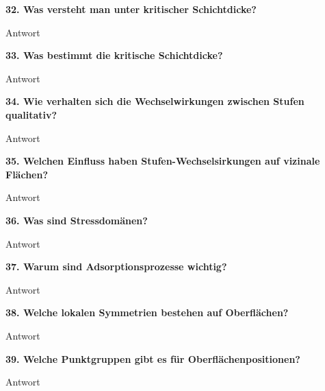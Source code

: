 \noindent\textbf{32. Was versteht man unter kritischer Schichtdicke?}\\
\begin{addmargin}[25pt]{0pt}
Antwort\\
\end{addmargin}

\noindent\textbf{33. Was bestimmt die kritische Schichtdicke?}\\
\begin{addmargin}[25pt]{0pt}
Antwort\\
\end{addmargin}

\noindent\textbf{34. Wie verhalten sich die Wechselwirkungen zwischen Stufen qualitativ?}\\
\begin{addmargin}[25pt]{0pt}
Antwort\\
\end{addmargin}

\noindent\textbf{35. Welchen Einfluss haben Stufen-Wechselsirkungen auf vizinale Flächen?}\\
\begin{addmargin}[25pt]{0pt}
Antwort\\
\end{addmargin}

\noindent\textbf{36. Was sind Stressdomänen?}\\
\begin{addmargin}[25pt]{0pt}
Antwort\\
\end{addmargin}

\noindent\textbf{37. Warum sind Adsorptionsprozesse wichtig?}\\
\begin{addmargin}[25pt]{0pt}
Antwort\\
\end{addmargin}

\noindent\textbf{38. Welche lokalen Symmetrien bestehen auf Oberflächen?}\\
\begin{addmargin}[25pt]{0pt}
Antwort\\
\end{addmargin}

\noindent\textbf{39. Welche Punktgruppen gibt es für Oberflächenpositionen?}\\
\begin{addmargin}[25pt]{0pt}
Antwort\\
\end{addmargin}

